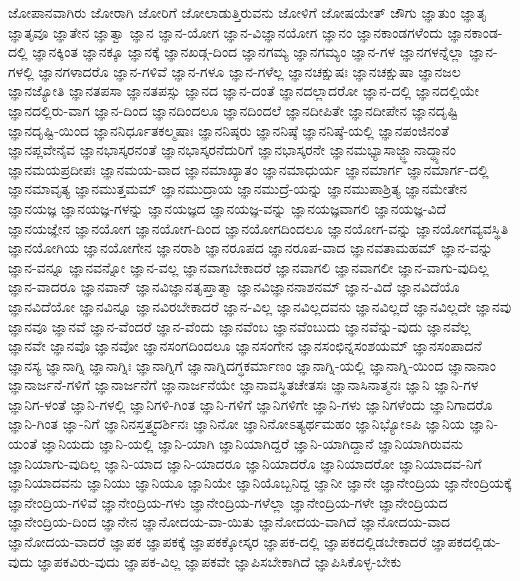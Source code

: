 {ಜೋಪಾನವಾಗಿರು
ಜೋರಾಗಿ
ಜೋರಿಗೆ
ಜೋಲಾಡುತ್ತಿರುವನು
ಜೋಳಿಗೆ
ಜೋಷಯೇತ್
ಜೌಗು
ಜ್ಞಾತುಂ
ಜ್ಞಾತೃ
ಜ್ಞಾತೃವೂ
ಜ್ಞಾತೇನ
ಜ್ಞಾತ್ವಾ
ಜ್ಞಾನ
ಜ್ಞಾನ-ಯೋಗ
ಜ್ಞಾನ-ವಿಜ್ಞಾನಯೋಗ
ಜ್ಞಾನಂ
ಜ್ಞಾನಕಾಂಡಗಳೆಂದು
ಜ್ಞಾನಕಾಂಡ-ದಲ್ಲಿ
ಜ್ಞಾನಕ್ಕಿಂತ
ಜ್ಞಾನಕ್ಕೂ
ಜ್ಞಾನಕ್ಕೆ
ಜ್ಞಾನಖಡ್ಗ-ದಿಂದ
ಜ್ಞಾನಗಮ್ಯ
ಜ್ಞಾನಗಮ್ಯಂ
ಜ್ಞಾನ-ಗಳ
ಜ್ಞಾನಗಳನ್ನೆಲ್ಲಾ
ಜ್ಞಾನ-ಗಳಲ್ಲಿ
ಜ್ಞಾನಗಳಾದರೊ
ಜ್ಞಾನ-ಗಳಿವೆ
ಜ್ಞಾನ-ಗಳೂ
ಜ್ಞಾನ-ಗಳೆಲ್ಲ
ಜ್ಞಾನಚಕ್ಷುಷಃ
ಜ್ಞಾನಚಕ್ಷುಷಾ
ಜ್ಞಾನಜಲ
ಜ್ಞಾನಜ್ಯೋತಿ
ಜ್ಞಾನತಪಸಾ
ಜ್ಞಾನತಪಸ್ಸು
ಜ್ಞಾನದ
ಜ್ಞಾನ-ದಂತೆ
ಜ್ಞಾನದಲ್ಲಾದರೋ
ಜ್ಞಾನ-ದಲ್ಲಿ
ಜ್ಞಾನದಲ್ಲಿಯೇ
ಜ್ಞಾನದಲ್ಲಿರು-ವಾಗ
ಜ್ಞಾನ-ದಿಂದ
ಜ್ಞಾನದಿಂದಲೂ
ಜ್ಞಾನದಿಂದಲೆ
ಜ್ಞಾನದೀಪಿತೇ
ಜ್ಞಾನದೀಪೇನ
ಜ್ಞಾನದೃಷ್ಟಿ
ಜ್ಞಾನದೃಷ್ಟಿ-ಯಿಂದ
ಜ್ಞಾನನಿರ್ಧೂತಕಲ್ಮಷಾಃ
ಜ್ಞಾನನಿಷ್ಠರು
ಜ್ಞಾನನಿಷ್ಠೆ
ಜ್ಞಾನನಿಷ್ಠೆ-ಯಲ್ಲಿ
ಜ್ಞಾನಪಂಜಿನಂತೆ
ಜ್ಞಾನಪ್ಲವೇನೈವ
ಜ್ಞಾನಭಾಸ್ಕರನಂತೆ
ಜ್ಞಾನಭಾಸ್ಕರನೆದುರಿಗೆ
ಜ್ಞಾನಭಾಸ್ಕರನೇ
ಜ್ಞಾನಮಭ್ಯಾಸಾಜ್ಜ್ಞಾನಾದ್ಧ್ಯಾನಂ
ಜ್ಞಾನಮಯಪ್ರದೀಪಃ
ಜ್ಞಾನಮಯ-ವಾದ
ಜ್ಞಾನಮಾಖ್ಯಾತಂ
ಜ್ಞಾನಮಾಧುರ್ಯ
ಜ್ಞಾನಮಾರ್ಗ
ಜ್ಞಾನಮಾರ್ಗ-ದಲ್ಲಿ
ಜ್ಞಾನಮಾವೃತ್ಯ
ಜ್ಞಾನಮುತ್ತಮಮ್
ಜ್ಞಾನಮುದ್ರಾಯ
ಜ್ಞಾನಮುದ್ರೆ-ಯನ್ನು
ಜ್ಞಾನಮುಪಾಶ್ರಿತ್ಯ
ಜ್ಞಾನಮೇತೇನ
ಜ್ಞಾನಯಜ್ಞ
ಜ್ಞಾನಯಜ್ಞ-ಗಳನ್ನು
ಜ್ಞಾನಯಜ್ಞದ
ಜ್ಞಾನಯಜ್ಞ-ವನ್ನು
ಜ್ಞಾನಯಜ್ಞವಾಗಲಿ
ಜ್ಞಾನಯಜ್ಞ-ವಿದೆ
ಜ್ಞಾನಯಜ್ಞೇನ
ಜ್ಞಾನಯೋಗ
ಜ್ಞಾನಯೋಗ-ದಿಂದ
ಜ್ಞಾನಯೋಗದಿಂದಲೂ
ಜ್ಞಾನಯೋಗ-ವನ್ನು
ಜ್ಞಾನಯೋಗವ್ಯವಸ್ಥಿತಿ
ಜ್ಞಾನಯೋಗಿಯ
ಜ್ಞಾನಯೋಗೇನ
ಜ್ಞಾನರಾಶಿ
ಜ್ಞಾನರೂಪದ
ಜ್ಞಾನರೂಪ-ವಾದ
ಜ್ಞಾನವತಾಮಹಮ್
ಜ್ಞಾನ-ವನ್ನು
ಜ್ಞಾನ-ವನ್ನೂ
ಜ್ಞಾನವನ್ನೋ
ಜ್ಞಾನ-ವಲ್ಲ
ಜ್ಞಾನವಾಗಬೇಕಾದರೆ
ಜ್ಞಾನವಾಗಲಿ
ಜ್ಞಾನವಾಗಲೀ
ಜ್ಞಾನ-ವಾಗು-ವುದಿಲ್ಲ
ಜ್ಞಾನ-ವಾದರೂ
ಜ್ಞಾನವಾನ್
ಜ್ಞಾನವಿಜ್ಞಾನತೃಪ್ತಾತ್ಮಾ
ಜ್ಞಾನವಿಜ್ಞಾನನಾಶನಮ್
ಜ್ಞಾನ-ವಿದೆ
ಜ್ಞಾನವಿದೆಯೊ
ಜ್ಞಾನವಿದೆಯೋ
ಜ್ಞಾನವಿನ್ನೂ
ಜ್ಞಾನವಿರಬೇಕಾದರೆ
ಜ್ಞಾನ-ವಿಲ್ಲ
ಜ್ಞಾನವಿಲ್ಲದವನು
ಜ್ಞಾನವಿಲ್ಲದೆ
ಜ್ಞಾನವಿಲ್ಲದೇ
ಜ್ಞಾನವು
ಜ್ಞಾನವೂ
ಜ್ಞಾನವೆ
ಜ್ಞಾನ-ವೆಂದರೆ
ಜ್ಞಾನ-ವೆಂದು
ಜ್ಞಾನವೆಂಬ
ಜ್ಞಾನವೆಂಬುದು
ಜ್ಞಾನವೆನ್ನು-ವುದು
ಜ್ಞಾನವೆಲ್ಲ
ಜ್ಞಾನವೇ
ಜ್ಞಾನವೊ
ಜ್ಞಾನವೋ
ಜ್ಞಾನಸಂಗದಿಂದಲೂ
ಜ್ಞಾನಸಂಗೇನ
ಜ್ಞಾನಸಂಛಿನ್ನಸಂಶಯಮ್
ಜ್ಞಾನಸಂಪಾದನೆ
ಜ್ಞಾನಸ್ಯ
ಜ್ಞಾನಾಗ್ನಿ
ಜ್ಞಾನಾಗ್ನಿಃ
ಜ್ಞಾನಾಗ್ನಿಗೆ
ಜ್ಞಾನಾಗ್ನಿದಗ್ಧಕರ್ಮಾಣಂ
ಜ್ಞಾನಾಗ್ನಿ-ಯಲ್ಲಿ
ಜ್ಞಾನಾಗ್ನಿ-ಯಿಂದ
ಜ್ಞಾನಾನಾಂ
ಜ್ಞಾನಾರ್ಜನೆ-ಗಳಿಗೆ
ಜ್ಞಾನಾರ್ಜನೆಗೆ
ಜ್ಞಾನಾರ್ಜನೆಯೇ
ಜ್ಞಾನಾವಸ್ಥಿತಚೇತಸಃ
ಜ್ಞಾನಾಸಿನಾತ್ಮನಃ
ಜ್ಞಾನಿ
ಜ್ಞಾನಿ-ಗಳ
ಜ್ಞಾನಿಗ-ಳಂತೆ
ಜ್ಞಾನಿ-ಗಳಲ್ಲಿ
ಜ್ಞಾನಿಗಳಿ-ಗಿಂತ
ಜ್ಞಾನಿ-ಗಳಿಗೆ
ಜ್ಞಾನಿಗಳಿಗೇ
ಜ್ಞಾನಿ-ಗಳು
ಜ್ಞಾನಿಗಳೆಂದು
ಜ್ಞಾನಿಗಾದರೊ
ಜ್ಞಾನಿ-ಗಿಂತ
ಜ್ಞಾ-ನಿಗೆ
ಜ್ಞಾನಿನಸ್ತತ್ತ್ವದರ್ಶಿನಃ
ಜ್ಞಾನಿನೋ
ಜ್ಞಾನಿನೋಽತ್ಯರ್ಥಮಹಂ
ಜ್ಞಾನಿಭ್ಯೋಽಪಿ
ಜ್ಞಾನಿಯ
ಜ್ಞಾನಿ-ಯಂತೆ
ಜ್ಞಾನಿಯದು
ಜ್ಞಾನಿ-ಯಲ್ಲಿ
ಜ್ಞಾನಿ-ಯಾಗಿ
ಜ್ಞಾನಿಯಾಗಿದ್ದರೆ
ಜ್ಞಾನಿ-ಯಾಗಿದ್ದಾನೆ
ಜ್ಞಾನಿಯಾಗಿರುವನು
ಜ್ಞಾನಿಯಾಗು-ವುದಿಲ್ಲ
ಜ್ಞಾನಿ-ಯಾದ
ಜ್ಞಾನಿ-ಯಾದರೂ
ಜ್ಞಾನಿಯಾದರೊ
ಜ್ಞಾನಿಯಾದರೋ
ಜ್ಞಾನಿಯಾದವ-ನಿಗೆ
ಜ್ಞಾನಿಯಾದವನು
ಜ್ಞಾನಿಯು
ಜ್ಞಾನಿಯೂ
ಜ್ಞಾನಿಯೇ
ಜ್ಞಾನಿಯೊಬ್ಬನಿದ್ದ
ಜ್ಞಾನೀ
ಜ್ಞಾನೇ
ಜ್ಞಾನೇಂದ್ರಿಯ
ಜ್ಞಾನೇಂದ್ರಿಯಕ್ಕೆ
ಜ್ಞಾನೇಂದ್ರಿಯ-ಗಳಿವೆ
ಜ್ಞಾನೇಂದ್ರಿಯ-ಗಳು
ಜ್ಞಾನೇಂದ್ರಿಯ-ಗಳೆಲ್ಲಾ
ಜ್ಞಾನೇಂದ್ರಿಯ-ಗಳೇ
ಜ್ಞಾನೇಂದ್ರಿಯದ
ಜ್ಞಾನೇಂದ್ರಿಯ-ದಿಂದ
ಜ್ಞಾನೇನ
ಜ್ಞಾನೋದಯ-ವಾ-ಯಿತು
ಜ್ಞಾನೋದಯ-ವಾಗಿದೆ
ಜ್ಞಾನೋದಯ-ವಾದ
ಜ್ಞಾನೋದಯ-ವಾದರೆ
ಜ್ಞಾಪಕ
ಜ್ಞಾಪಕಕ್ಕೆ
ಜ್ಞಾಪಕಕ್ಕೋಸ್ಕರ
ಜ್ಞಾಪಕ-ದಲ್ಲಿ
ಜ್ಞಾಪಕದಲ್ಲಿಡಬೇಕಾದರೆ
ಜ್ಞಾಪಕದಲ್ಲಿಡು-ವುದು
ಜ್ಞಾಪಕವಿರು-ವುದು
ಜ್ಞಾಪಕ-ವಿಲ್ಲ
ಜ್ಞಾಪಕವೇ
ಜ್ಞಾಪಿಸಬೇಕಾಗಿದೆ
ಜ್ಞಾಪಿಸಿಕೊಳ್ಳ-ಬೇಕು
}
